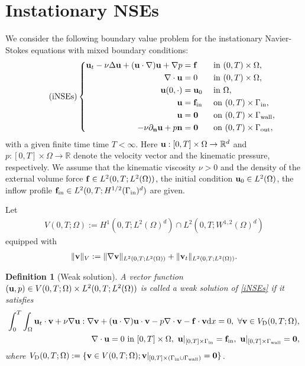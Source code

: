 \documentclass[oneside,11pt]{book}
\numberwithin{equation}{section}
\newtheorem{definition}{Definition}[section]
\begin{document}
\section{Instationary NSEs}
We consider the following boundary value problem for the instationary Navier-Stokes equations with mixed boundary conditions:
\begin{equation}
    \label{iNSEs}
    \tag{iNSEs}
    \left\{\begin{split}
        {\bf u}_t - \nu\Delta{\bf u} + ({\bf u}\cdot\nabla){\bf u} + \nabla p &= {\bf f} &&\mbox{ in } (0,T)\times\Omega,\\
        \nabla\cdot{\bf u} &= 0 &&\mbox{ in } (0,T)\times\Omega,\\
        {\bf u}(0,\cdot) &= {\bf u}_0 &&\mbox{ in } \Omega,\\
        {\bf u} &= {\bf f}_{\rm in} &&\mbox{ on } (0,T)\times\Gamma_{\rm in},\\
        {\bf u} &= {\bf 0} &&\mbox{ on } (0,T)\times\Gamma_{\rm wall},\\
        -\nu\partial_{\bf n}{\bf u} + p{\bf n} &= {\bf 0} &&\mbox{ on } (0,T)\times\Gamma_{\rm out},
    \end{split}\right.
\end{equation}
with a given finite time time $T < \infty$. Here ${\bf u}:[0,T]\times\Omega\to\mathbb{R}^d$ and $p:[0,T]\times\Omega\to\mathbb{R}$ denote the velocity vector and the kinematic pressure, respectively. We assume that the kinematic viscosity $\nu > 0$ and the density of the external volume force ${\bf f}\in L^2(0,T;L^2(\Omega))$, the initial condition ${\bf u}_0\in L^2(\Omega)$, the inflow profile ${\bf f}_{\rm in}\in L^2(0,T;H^{1/2}(\Gamma_{\rm in})^d)$ are given.

Let
\begin{align*}
    V(0,T;\Omega) := H^1(0,T;L^2(\Omega)^d)\cap L^2(0,T;W^{1,2}(\Omega)^d)
\end{align*}
equipped with
\begin{align*}
    \|{\bf v}\|_V := \|\nabla{\bf v}\|_{L^2(0,T;L^2(\Omega))} + \|{\bf v}_t\|_{L^2(0,T;L^2(\Omega))}.
\end{align*}

\begin{definition}[Weak solution]
    A vector function $({\bf u},p)\in V(0,T;\Omega)\times L^2(0,T;L^2(\Omega))$ is called a \emph{weak solution} of \eqref{iNSEs} if it satisfies
    \begin{align}
        \int_0^T\int_\Omega {\bf u}_t\cdot{\bf v} + \nu\nabla{\bf u}:\nabla{\bf v} + ({\bf u}\cdot\nabla){\bf u}\cdot{\bf v} - p\nabla\cdot{\bf v} - {\bf f}\cdot{\bf v}{\rm d}x = 0,\ \forall{\bf v}\in V_{\rm D}(0,T;\Omega),\\
        \nabla\cdot{\bf u} = 0 \mbox{ in } [0,T]\times\Omega,\ {\bf u}|_{[0,T]\times\Gamma_{\rm in}} = {\bf f}_{\rm in},\ {\bf u}|_{[0,T]\times\Gamma_{\rm wall}} = {\bf 0},
    \end{align}
    where $V_{\rm D}(0,T;\Omega) := \{{\bf v}\in V(0,T;\Omega);{\bf v}|_{[0,T]\times(\Gamma_{\rm in}\cup\Gamma_{\rm wall})} = {\bf 0}\}$.
\end{definition}
\end{document}

